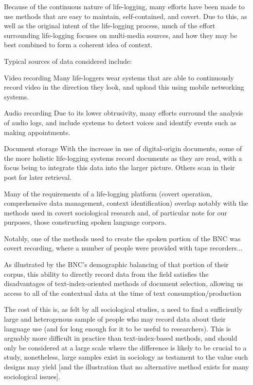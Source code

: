 
Because of the continuous nature of life-logging, many efforts have been made to use methods that are easy to maintain, self-contained, and covert.  %
Due to this, as well as the original intent of the life-logging process, much of the effort surrounding life-logging focuses on multi-media sources, and how they may be best combined to form a coherent idea of context.  

Typical sources of data considered include:

\begin{itemizeTitle}
    \item[Video recording] Many life-loggers wear systems that are able to continuously record video in the direction they look, and upload this using mobile networking systems.
    \item[Audio recording] Due to its lower obtrusivity, many efforts surround the analysis of audio logs, and include systems to detect voices and identify events such as making appointments.
    \item[Document storage] With the increase in use of digital-origin documents, some of the more holistic life-logging systems record documents as they are read, with a focus being to integrate this data into the larger picture.  Others scan in their post for later retrieval.
\end{itemizeTitle}

Many of the requirements of a life-logging platform (covert operation, comprehensive data management, context identification) overlap notably with the methods used in covert sociological research and, of particular note for our purposes, those constructing spoken language corpora.

Notably, one of the methods used to create the spoken portion of the BNC was covert recording, where a number of people were provided with tape recorders...

As illustrated by the BNC's demographic balancing of that portion of their corpus, this ability to directly record data from the field satisfies the disadvantages of text-index-oriented methods of document selection, allowing us access to all of the contextual data at the time of text consumption/production 

The cost of this is, as felt by all sociological studies, a need to find a sufficiently large and heterogenous sample of people who may record data about their language use (and for long enough for it to be useful to researchers).  This is arguably more difficult in practice than text-index-based methods, and should only be considered at a large scale where the difference is likely to be crucial to a study, nonetheless, large samples exist in sociology as testament to the value such designs may yield [and the illustration that no alternative method exists for many sociological issues].

